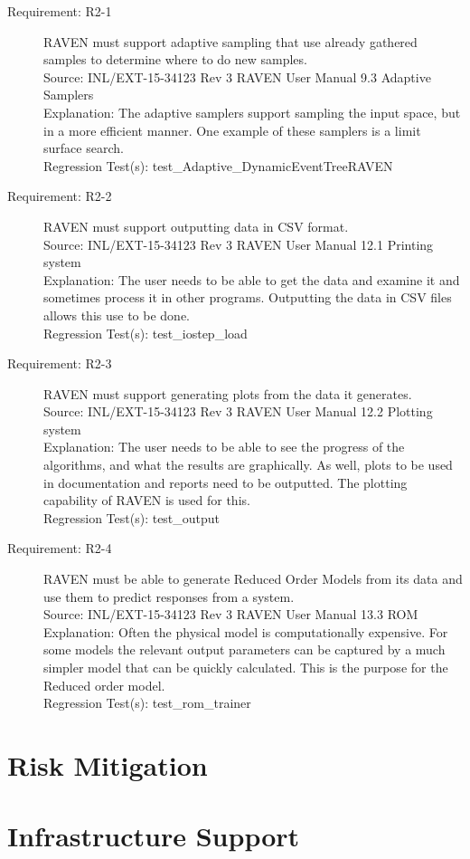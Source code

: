 \documentclass{article}
\newcommand{\requirement}[5]{\item[Requirement: #1] #2 \\Source: #3\\Explanation: #4\\Regression Test(s): #5}
\begin{document}
\begin{description}

\requirement{R2-1}{RAVEN must support adaptive sampling that use already gathered samples to determine where to do new samples.}
{INL/EXT-15-34123 Rev 3 RAVEN User Manual 9.3 Adaptive Samplers}
{The adaptive samplers support sampling the input space, but in a more efficient manner.  One example of these samplers is a limit surface search.}
{test\_Adaptive\_DynamicEventTreeRAVEN}

\requirement{R2-2}{RAVEN must support outputting data in CSV format.}
{INL/EXT-15-34123 Rev 3 RAVEN User Manual 12.1 Printing system}
{The user needs to be able to get the data and examine it and sometimes process it in other programs.  Outputting the data in CSV files allows this use to be done.}
{test\_iostep\_load}

\requirement{R2-3}{RAVEN must support generating plots from the data it generates.}
{INL/EXT-15-34123 Rev 3 RAVEN User Manual 12.2 Plotting system}
{The user needs to be able to see the progress of the algorithms, and what the results are graphically.  As well, plots to be used in documentation and reports need to be outputted.  The plotting capability of RAVEN is used for this.}
{test\_output}

\requirement{R2-4}{RAVEN must be able to generate Reduced Order Models from its data and use them to predict responses from a system.}
{INL/EXT-15-34123 Rev 3 RAVEN User Manual 13.3 ROM}
{Often the physical model is computationally expensive.  For some models the relevant output parameters can be captured by a much simpler model that can be quickly calculated.  This is the purpose for the Reduced order model.}
{test\_rom\_trainer}

\end{description}

\section{Risk Mitigation}



\section{Infrastructure Support}
\end{document}
